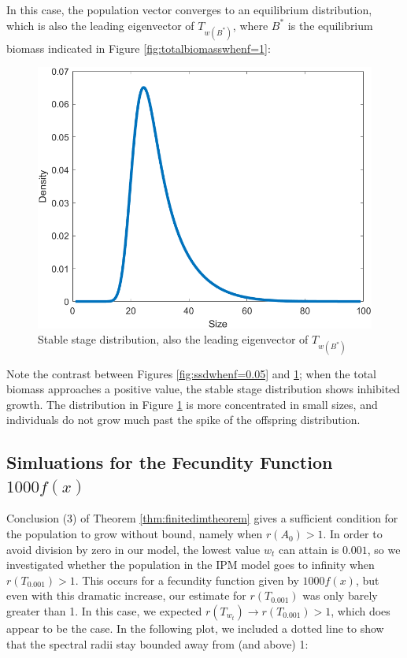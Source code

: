In this case, the population vector converges to an equilibrium distribution, which is also the leading eigenvector of $T_{w(B^*)}$, where $B^*$ is the equilibrium biomass indicated in Figure \ref{fig:totalbiomasswhenf=1}:

\begin{figure}[H]
	\centering
	\includegraphics[width=0.7\linewidth]{Images/F=1/ssd_when_f=1}
	\caption{Stable stage distribution, also the leading eigenvector of $T_{w(B^*)}$}
	\label{fig:ssdwhenf=1}
\end{figure}

Note the contrast between Figures \ref{fig:ssdwhenf=0.05} and \ref{fig:ssdwhenf=1}; when the total biomass approaches a positive value, the stable stage distribution shows inhibited growth. The distribution in Figure \ref{fig:ssdwhenf=1} is more concentrated in small sizes, and individuals do not grow much past the spike of the offspring distribution.

\subsection{Simluations for the Fecundity Function $1000f(x)$} \label{subsec:1000f(x)}

Conclusion (3) of Theorem \ref{thm:finitedimtheorem} gives a sufficient condition for the population to grow without bound, namely when $r(A_0) >1$. In order to avoid division by zero in our model, the lowest value $w_t$ can attain is $0.001$, so we investigated whether the population in the IPM model goes to infinity when $r(T_{0.001}) > 1$. This occurs for a fecundity function given by $1000f(x)$, but even with this dramatic increase, our estimate for $r(T_{0.001})$ was only barely greater than 1. In this case, we expected $r(T_{w_t}) \to r(T_{0.001}) > 1$, which does appear to be the case. In the following plot, we included a dotted line to show that the spectral radii stay bounded away from (and above) 1:

